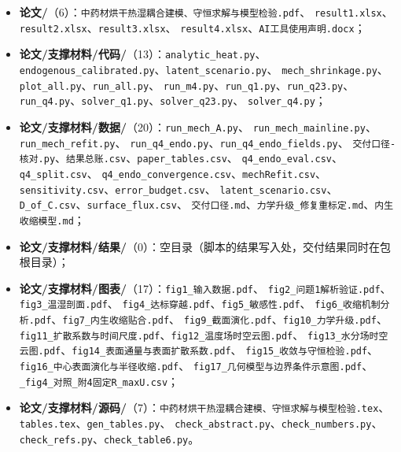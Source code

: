 \documentclass[12pt,a4paper]{ctexart}
\numberwithin{equation}{section}
\begin{document}
{\raggedright
\newcommand{\fsep}{、\allowbreak}
\begin{itemize}
  \item \textbf{论文/}（6）：\texttt{中药材烘干热湿耦合建模、守恒求解与模型检验.pdf}\fsep
        \texttt{result1.xlsx}\fsep \texttt{result2.xlsx}\fsep \texttt{result3.xlsx}\fsep
        \texttt{result4.xlsx}\fsep \texttt{AI工具使用声明.docx}；
  \item \textbf{论文/支撑材料/代码/}（13）：\texttt{analytic\_heat.py}\fsep
        \texttt{endogenous\_calibrated.py}\fsep \texttt{latent\_scenario.py}\fsep
        \texttt{mech\_shrinkage.py}\fsep \texttt{plot\_all.py}\fsep \texttt{run\_all.py}\fsep
        \texttt{run\_m4.py}\fsep \texttt{run\_q1.py}\fsep \texttt{run\_q23.py}\fsep
        \texttt{run\_q4.py}\fsep \texttt{solver\_q1.py}\fsep \texttt{solver\_q23.py}\fsep
        \texttt{solver\_q4.py}；
  \item \textbf{论文/支撑材料/数据/}（20）：\texttt{run\_mech\_A.py}\fsep
        \texttt{run\_mech\_mainline.py}\fsep \texttt{run\_mech\_refit.py}\fsep
        \texttt{run\_q4\_endo.py}\fsep \texttt{run\_q4\_endo\_fields.py}\fsep
        \texttt{交付口径-核对.py}\fsep \texttt{结果总账.csv}\fsep \texttt{paper\_tables.csv}\fsep
        \texttt{q4\_endo\_eval.csv}\fsep \texttt{q4\_split.csv}\fsep
        \texttt{q4\_endo\_convergence.csv}\fsep \texttt{mechRefit.csv}\fsep
        \texttt{sensitivity.csv}\fsep \texttt{error\_budget.csv}\fsep
        \texttt{latent\_scenario.csv}\fsep \texttt{D\_of\_C.csv}\fsep \texttt{surface\_flux.csv}\fsep
        \texttt{交付口径.md}\fsep \texttt{力学升级\_修复重标定.md}\fsep \texttt{内生收缩模型.md}；
  \item \textbf{论文/支撑材料/结果/}（0）：空目录（脚本的结果写入处，交付结果同时在包根目录）；
  \item \textbf{论文/支撑材料/图表/}（17）：\texttt{fig1\_输入数据.pdf}\fsep
        \texttt{fig2\_问题1解析验证.pdf}\fsep \texttt{fig3\_温湿剖面.pdf}\fsep
        \texttt{fig4\_达标穿越.pdf}\fsep \texttt{fig5\_敏感性.pdf}\fsep
        \texttt{fig6\_收缩机制分析.pdf}\fsep \texttt{fig7\_内生收缩贴合.pdf}\fsep
        \texttt{fig9\_截面演化.pdf}\fsep \texttt{fig10\_力学升级.pdf}\fsep
        \texttt{fig11\_扩散系数与时间尺度.pdf}\fsep \texttt{fig12\_温度场时空云图.pdf}\fsep
        \texttt{fig13\_水分场时空云图.pdf}\fsep \texttt{fig14\_表面通量与表面扩散系数.pdf}\fsep
        \texttt{fig15\_收敛与守恒检验.pdf}\fsep \texttt{fig16\_中心表面演化与半径收缩.pdf}\fsep
        \texttt{fig17\_几何模型与边界条件示意图.pdf}\fsep
        \texttt{\_fig4\_对照\_附4固定R\_maxU.csv}；
  \item \textbf{论文/支撑材料/源码/}（7）：\texttt{中药材烘干热湿耦合建模、守恒求解与模型检验.tex}\fsep
        \texttt{tables.tex}\fsep \texttt{gen\_tables.py}\fsep
        \texttt{check\_abstract.py}\fsep \texttt{check\_numbers.py}\fsep
        \texttt{check\_refs.py}\fsep \texttt{check\_table6.py}。
\end{itemize}}
\end{document}
